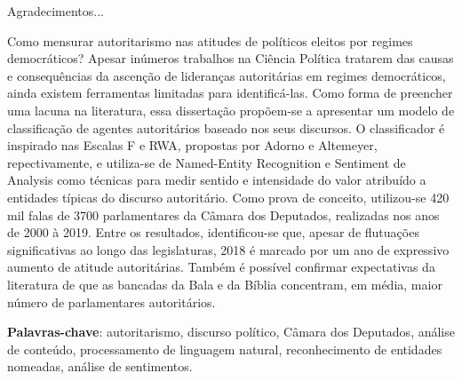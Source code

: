 \documentclass[
12pt,				%
openright,			%
twoside,			%
a4paper,			%
english,			%
french,				%
spanish,			%
brazil				%
]{abntex2}
\begin{document}
\begin{agradecimentos}
	Agradecimentos...	
\end{agradecimentos}


\setlength{\absparsep}{18pt} %
\begin{resumo}
	Como mensurar autoritarismo nas atitudes de políticos eleitos por regimes democráticos? Apesar inúmeros trabalhos na Ciência Política tratarem das causas e consequências da ascenção de lideranças autoritárias em regimes democráticos, ainda existem ferramentas limitadas para identificá-las. Como forma de preencher uma lacuna na literatura, essa dissertação propõem-se a apresentar um modelo de classificação de agentes autoritários baseado nos seus discursos. O classificador é inspirado nas Escalas F e RWA, propostas por Adorno e Altemeyer, repectivamente, e utiliza-se de Named-Entity Recognition e Sentiment de Analysis como técnicas para medir sentido e intensidade do valor atribuído a entidades típicas do discurso autoritário. Como prova de conceito, utilizou-se 420 mil falas de 3700 parlamentares da Câmara dos Deputados, realizadas nos anos de 2000 à 2019. Entre os resultados, identificou-se que, apesar de flutuações significativas ao longo das legislaturas, 2018 é marcado por um ano de expressivo aumento de atitude autoritárias. Também é possível confirmar expectativas da literatura de que as bancadas da Bala e da Bíblia concentram, em média, maior número de parlamentares autoritários.

	\textbf{Palavras-chave}: autoritarismo, discurso político, Câmara dos Deputados, análise de conteúdo, processamento de linguagem natural, reconhecimento de entidades nomeadas, análise de sentimentos.
\end{resumo}
\end{document}
